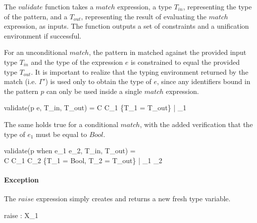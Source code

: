 \documentclass[class=article, crop=false]{standalone}
\begin{document}
\medskip

The $validate$ function takes a $match$ expression, a type $T_{in}$, representing the type of the pattern, and a $T_{out}$, representing the result of evaluating the $match$ expression, as inputs.
The function outputs a set of constraints and a unification environment if successful.

For an unconditional $match$, the pattern in matched against the provided input type $T_{in}$ and the type of the expression $e$ is constrained to equal the provided type $T_{out}$.
It is important to realize that the typing environment returned by the match (i.e. $\Gamma'$) is used only to obtain the type of $e$, since any identifiers bound in the pattern $p$ can only be used inside a single $match$ expression.

  {\Gamma \vdash validate(p \rightarrow e, T_{in}, T_{out}) = C \cup C_1 \cup \{T_1 = T_{out}\} \; | \; \gamma_1}

The same holds true for a conditional $match$, with the added verification that the type of $e_1$ must be equal to $Bool$.

  {\Gamma \vdash validate(p \; \mbox{when} \; e_1 \rightarrow e_2, T_{in}, T_{out}) =\\
  C \cup C_1 \cup C_2 \cup \{T_1 = Bool, T_2 = T_{out}\} \; | \; \gamma_1 \cup \gamma_2}

\paragraph{Exception}

The $raise$ expression simply creates and returns a new fresh type variable.

    {\Gamma \vdash raise : X_1}
\end{document}
